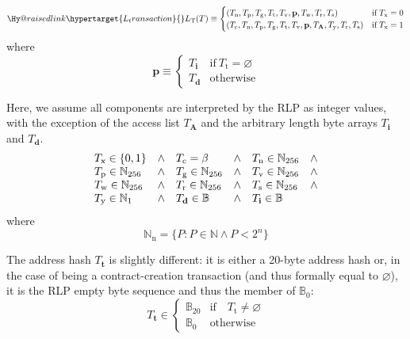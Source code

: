 \documentclass[9pt,oneside]{amsart}
\makeatletter
\newcommand{\linkdest}[1]{\Hy@raisedlink{\hypertarget{#1}{}}}
\makeatother
\begin{document}
\begin{multicols}{2}
\begin{equation}
\linkdest{L_transaction} L_{\mathrm{T}}(T) \equiv \begin{cases}
(T_{\mathrm{n}}, T_{\mathrm{p}}, T_{\mathrm{g}}, T_{\mathrm{t}}, T_{\mathrm{v}}, \mathbf{p}, T_{\mathrm{w}}, T_{\mathrm{r}}, T_{\mathrm{s}}) & \text{if} \; T_{\mathrm{x}} = 0 \\
(T_{\mathrm{c}}, T_{\mathrm{n}}, T_{\mathrm{p}}, T_{\mathrm{g}}, T_{\mathrm{t}}, T_{\mathrm{v}}, \mathbf{p}, T_{\mathbf{A}}, T_{\mathrm{y}}, T_{\mathrm{r}}, T_{\mathrm{s}}) & \text{if} \; T_{\mathrm{x}} = 1 \\
\end{cases}
\end{equation}
where
\begin{equation}
\mathbf{p} \equiv \begin{cases}
T_{\mathbf{i}} & \text{if}\ T_{\mathrm{t}} = \varnothing \\
T_{\mathbf{d}} & \text{otherwise}
\end{cases}
\end{equation}

Here, we assume all components are interpreted by the RLP as integer values, with the exception of the access list $T_{\mathbf{A}}$ and the arbitrary length byte arrays $T_{\mathbf{i}}$ and $T_{\mathbf{d}}$.
\begin{equation}
\begin{array}[t]{lclclc}
T_{\mathrm{x}} \in \{0, 1\} & \wedge & T_{\mathrm{c}} = \beta & \wedge & T_{\mathrm{n}} \in \mathbb{N}_{256} & \wedge \\
T_{\mathrm{p}} \in \mathbb{N}_{256} & \wedge & T_{\mathrm{g}} \in \mathbb{N}_{256} & \wedge & T_{\mathrm{v}} \in \mathbb{N}_{256} & \wedge \\
T_{\mathrm{w}} \in \mathbb{N}_{256} & \wedge & T_{\mathrm{r}} \in \mathbb{N}_{256} & \wedge & T_{\mathrm{s}} \in \mathbb{N}_{256} & \wedge \\
T_{\mathrm{y}} \in \mathbb{N}_{1} & \wedge & T_{\mathbf{d}} \in \mathbb{B} & \wedge & T_{\mathbf{i}} \in \mathbb{B}
\end{array}
\end{equation}
where
\begin{equation}
\mathbb{N}_{\mathrm{n}} = \{ P: P \in \mathbb{N} \wedge P < 2^n \}
\end{equation}

The address hash $T_{\mathbf{t}}$ is slightly different: it is either a 20-byte address hash or, in the case of being a contract-creation transaction (and thus formally equal to $\varnothing$), it is the RLP empty byte sequence and thus the member of $\mathbb{B}_0$:
\begin{equation}
T_{\mathbf{t}} \in \begin{cases} \mathbb{B}_{20} & \text{if} \quad T_{\mathrm{t}} \neq \varnothing \\
\mathbb{B}_{0} & \text{otherwise}\end{cases}
\end{equation}


\end{multicols}
\end{document}
